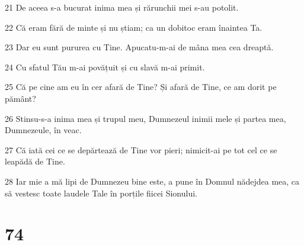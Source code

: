 \par 21 De aceea s-a bucurat inima mea și rărunchii mei s-au potolit.
\par 22 Că eram fără de minte și nu știam; ca un dobitoc eram înaintea Ta.
\par 23 Dar eu sunt pururea cu Tine. Apucatu-m-ai de mâna mea cea dreaptă.
\par 24 Cu sfatul Tău m-ai povățuit și cu slavă m-ai primit.
\par 25 Că pe cine am eu în cer afară de Tine? Și afară de Tine, ce am dorit pe pământ?
\par 26 Stinsu-s-a inima mea și trupul meu, Dumnezeul inimii mele și partea mea, Dumnezeule, în veac.
\par 27 Că iată cei ce se depărtează de Tine vor pieri; nimicit-ai pe tot cel ce se leapădă de Tine.
\par 28 Iar mie a mă lipi de Dumnezeu bine este, a pune în Domnul nădejdea mea, ca să vestesc toate laudele Tale în porțile fiicei Sionului.

\chapter{74}

